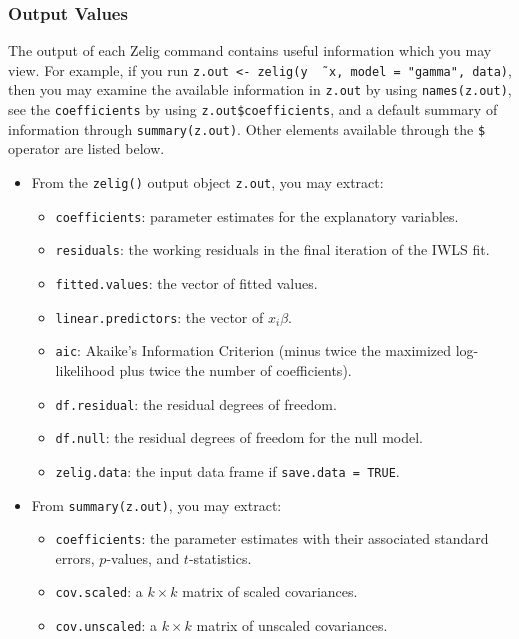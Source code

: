 \subsubsection{Output Values}

The output of each Zelig command contains useful information which you
may view.  For example, if you run \texttt{z.out <- zelig(y \~\,
  x, model = "gamma", data)}, then you may examine the available
information in \texttt{z.out} by using \texttt{names(z.out)},
see the {\tt coefficients} by using {\tt z.out\$coefficients}, and
a default summary of information through \texttt{summary(z.out)}.
Other elements available through the {\tt \$} operator are listed
below.

\begin{itemize}
\item From the {\tt zelig()} output object {\tt z.out}, you may
  extract:
   \begin{itemize}
   \item {\tt coefficients}: parameter estimates for the explanatory
     variables.
   \item {\tt residuals}: the working residuals in the final iteration
     of the IWLS fit.
   \item {\tt fitted.values}: the vector of fitted values.
   \item {\tt linear.predictors}: the vector of $x_{i}\beta$.
   \item {\tt aic}: Akaike's Information Criterion (minus twice the
     maximized log-likelihood plus twice the number of coefficients).
   \item {\tt df.residual}: the residual degrees of freedom.
   \item {\tt df.null}: the residual degrees of freedom for the null
     model.
   \item {\tt zelig.data}: the input data frame if {\tt save.data = TRUE}.  
   \end{itemize}

\item From {\tt summary(z.out)}, you may extract: 
   \begin{itemize}
   \item {\tt coefficients}: the parameter estimates with their
     associated standard errors, $p$-values, and $t$-statistics.
   \item{\tt cov.scaled}: a $k \times k$ matrix of scaled covariances.
   \item{\tt cov.unscaled}: a $k \times k$ matrix of unscaled
     covariances.  
   \end{itemize}


\end{itemize}
